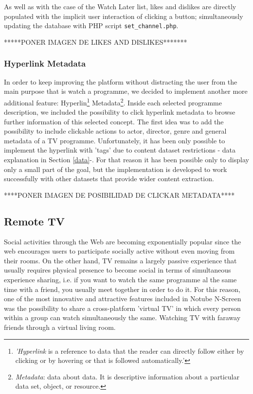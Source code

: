 \documentclass{acm_proc_article-sp}
\begin{document}
As well as with the case of the Watch Later list, likes and dislikes are directly populated with the implicit user interaction of clicking a button; simultaneously updating the database with PHP script \texttt{set\_channel.php}. 

*****PONER IMAGEN DE LIKES AND DISLIKES*******

\subsubsection{Hyperlink Metadata}

In order to keep improving the platform without distracting the user from the main purpose\cite{allen2012smashing} that is watch a programme, we decided to implement another more additional feature: Hyperlin\cite{wiki:hyper}\footnote{\textit{'Hyperlink} is a reference to data that the reader can directly follow either by clicking or by hovering or that is followed automatically.'} Metadata\footnote{\textit{Metadata}: data about data. It is descriptive information about a particular data set, object, or resource.}. Inside each selected programme description, we included the possibility to click hyperlink metadata to browse further information of this selected concept. The first idea was to add the possibility to include clickable actions to actor, director, genre and general metadata of a TV programme. Unfortunately, it has been only possible to implement the hyperlink with 'tags'  due to content dataset restrictions - data explanation in Section \ref{data}-. For that reason it has been possible only to display only a small part of the goal, but the implementation is developed to work successfully with other datasets that provide wider content extraction.

****PONER IMAGEN DE POSIBILIDAD DE CLICKAR METADATA****

\subsection{Remote TV}

Social activities through the Web are becoming exponentially popular since the web encourages users to  participate socially active without even moving from their rooms\cite{schopman2010notube}. On the other hand, TV remains a largely passive experience that usually requires physical presence to become social in terms of simultaneous experience sharing, i.e. if you want to watch the same programme al the same time with a friend, you usually meet together in order to do it. For this reason, one of the most innovative and attractive features included in Notube N-Screen was the possibility to share a cross-platform 'virtual TV' in which every person within a group can watch simultaneously the same. Watching TV with faraway friends through a virtual living room.
\end{document}
